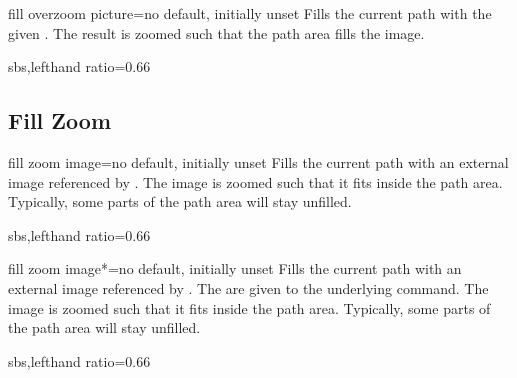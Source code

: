\begin{docTikzKey}{fill overzoom picture}{=}{no default, initially unset}
  Fills the current path with the given .
  The result is zoomed such that the path area fills the image.
\begin{dispExample*}{sbs,lefthand ratio=0.66}
\end{dispExample*}
\end{docTikzKey}


\clearpage
\subsection{Fill Zoom}
\begin{docTikzKey}{fill zoom image}{=}{no default, initially unset}
  Fills the current path with an external image referenced by .
  The image is zoomed such that it fits inside the path area.
  Typically, some parts of the path area will stay unfilled.
\begin{dispExample*}{sbs,lefthand ratio=0.66}
\end{dispExample*}
\end{docTikzKey}


\begin{docTikzKey}{fill zoom image*}{=}{no default, initially unset}
  Fills the current path with an external image referenced by .
  The  are given to the underlying  command.
  The image is zoomed such that it fits inside the path area.
  Typically, some parts of the path area will stay unfilled.
\begin{dispExample*}{sbs,lefthand ratio=0.66}
\end{dispExample*}
\end{docTikzKey}


